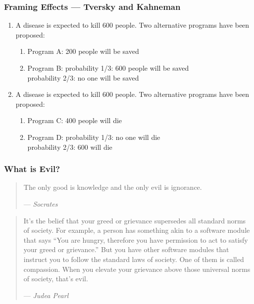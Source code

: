 \documentclass[UTF8,11pt,colorlinks,compress,openany]{beamer}%
\begin{document}
\begin{frame}\frametitle{Framing Effects --- Tversky and Kahneman}
\begin{enumerate}
	\item A disease is expected to kill 600 people. Two alternative programs have been proposed:
	\begin{enumerate}
		\item Program A: 200 people will be saved
		\item Program B: probability 1/3: 600 people will be saved\\
		probability 2/3: no one will be saved
	\end{enumerate}
	\item A disease is expected to kill 600 people. Two alternative programs have been proposed:
	\begin{enumerate}
		\item Program C: 400 people will die
		\item Program D: probability 1/3: no one will die\\
		probability 2/3: 600 will die
	\end{enumerate}
\end{enumerate}
\end{frame}

\begin{frame}\frametitle{What is Evil?}
\begin{quote}
The only good is knowledge and the only evil is ignorance.\par
\hfill --- \textsl{Socrates}
\end{quote}
\begin{quote}
It's the belief that your greed or grievance supersedes all standard norms of society. For example, a person has something akin to a software module that says ``You are hungry, therefore you have permission to act to satisfy your greed or grievance.'' But you have other software modules that instruct you to follow the standard laws of society. One of them is called compassion. When you elevate your grievance above those universal norms of society, that's evil.\par
\hfill --- \textsl{Judea Pearl}
\end{quote}
\end{frame}
\end{document}

